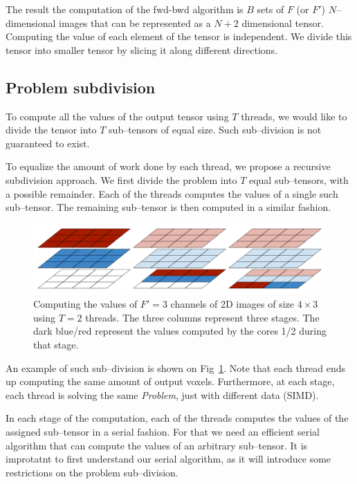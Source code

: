   The result the computation of the fwd-bwd algorithm is $B$ sets of
  $F$ (or $F'$) $N$--dimensional images that can be represented as a
  $N+2$ dimensional tensor.  Computing the value of each element of
  the tensor is independent.  We divide this tensor into smaller
  tensor by slicing it along different directions.

  \subsection{Problem subdivision}

  To compute all the values of the output
  tensor using $T$ threads, we would like to divide the tensor into
  $T$ sub--tensors of equal size.  Such sub--division is not
  guaranteed to exist.

  To equalize the amount of work done by each thread, we propose a
  recursive subdivision approach.  We first divide the problem into
  $T$ equal sub--tensors, with a possible remainder.  Each of the
  threads computes the values of a single such sub--tensor.  The
  remaining sub--tensor is then computed in a similar fashion.

  \begin{figure}
    \begin{center}
      \includegraphics[width=0.97\linewidth]{fig/static2}
    \end{center}
    \caption{Computing the values of $F'=3$ channels of 2D images of
      size $4 \times 3$ using $T=2$ threads.  The three columns
      represent three stages.  The dark blue/red represent the values
      computed by the cores 1/2 during that stage.}
    \label{fig:problem-subdivision}
  \end{figure}

  An example of such sub--division is shown on
  Fig~\ref{fig:problem-subdivision}.  Note that each thread ends up
  computing the same amount of output voxels.  Furthermore, at each
  stage, each thread is solving the same \emph{Problem}, just with
  different data (SIMD).

  In each stage of the computation, each of the threads computes the
  values of the assigned sub--tensor in a serial fashion.  For that we
  need an efficient serial algorithm that can compute the values of an
  arbitrary sub--tensor.  It is improtatnt to first understand our
  serial algorithm, as it will introduce some restrictions on the
  problem sub--division.

